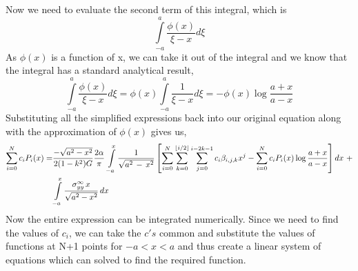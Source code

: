 \documentclass[1p,preprint,12pt]{elsarticle1}
\DeclarePairedDelimiter\floor{\lfloor}{\rfloor}
\begin{document}
Now we need to evaluate the second term of this integral, which is
\begin{equation}
\int\limits_{-a}^{a}\frac{\phi(x)}{\xi-x}d\xi
\end{equation}
As $\phi(x)$ is a function of x, we can take it out of the integral and we know that the integral has a standard analytical result,
\begin{equation}
\int\limits_{-a}^{a}\frac{\phi(x)}{\xi-x}d\xi = \phi(x)\int\limits_{-a}^{a}\frac{1}{\xi-x}d\xi = -\phi(x)\log{\frac{a+x}{a-x}}
\end{equation}
Substituting all the simplified expressions back into our original equation along with the approximation of $\phi(x)$ gives us,
\begin{equation}\label{3}
\begin{split}
			\sum\limits_{i=0}^{N}c_iP_i(x) = &\frac{-\sqrt{a^2-x^2}}{2(1-k^2)G}\frac{2\alpha}{\pi}\,\int\limits_{-a}^x \frac{1}{\sqrt{a^2\,-\,x^2}}\left[\sum\limits_{i=0}^{N}\sum\limits_{k=0}^{\floor*{i/2}}\sum\limits_{j=0}^{i-2k-1}c_i\beta_{i,j,k}x^j - \sum\limits_{i=0}^{N}c_iP_i(x)\log{\frac{a+x}{a-x}}\right]dx \,\, + 
\\ &\int\limits_{-a}^x \frac{\sigma^{\infty}_{yy}\,x}{\sqrt{a^2-x^2}}\,dx
\end{split}
\end{equation}
Now the entire expression can be integrated numerically. Since we need to find the values of $c_i$, we can take the $c's$ common and substitute the values of functions at N+1 points for $-a<x<a$ and thus
create a linear system of equations which can solved to find the required function. 
\end{document}
